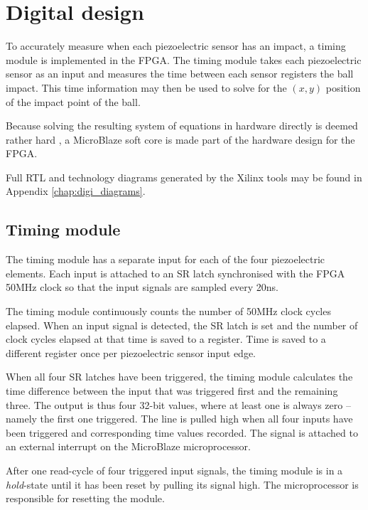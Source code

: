 \section{Digital design}
\label{cha:digidesign}
%
To accurately measure when each piezoelectric sensor has an impact, %
a timing module is implemented in the FPGA.
The timing module takes each piezoelectric sensor as an input and measures the time between each sensor registers the ball impact.
This time information may then be used to solve for the $(x,y)$ position of the impact point of the ball.

Because solving the resulting system of equations in hardware directly is deemed rather hard \cite{hardGauss}, a MicroBlaze soft core is made part of the hardware design for the FPGA.

Full RTL and technology diagrams generated by the Xilinx tools may be found in Appendix \ref{chap:digi_diagrams}.

\subsection{Timing module}
\label{sec:timing_module}
The timing module has a separate input for each of the four piezoelectric elements.
Each input is attached to an SR latch synchronised with the FPGA 50\si{MHz} clock so that the input signals are sampled every 20\si{ns}.

%     

The timing module continuously counts the number of 50\si{MHz} clock cycles elapsed.
When an input signal is detected, the SR latch is set and the number of clock cycles elapsed at that time is saved to a register.
Time is saved to a different register once per piezoelectric sensor input edge.

When all four SR latches have been triggered, the timing module calculates the time difference between the input that was triggered first and the remaining three.
The output is thus four 32-bit values, where at least one is always zero -- namely the first one triggered.
The line  is pulled high when all four inputs have been triggered and corresponding time values recorded.
The  signal is attached to an external interrupt on the MicroBlaze microprocessor.

After one read-cycle of four triggered input signals, the timing module is in a \emph{hold}-state until it has been reset by pulling its  signal high.
The microprocessor is responsible for resetting the module.
